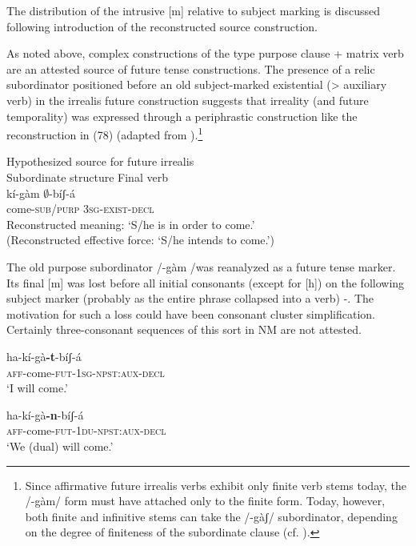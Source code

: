 \documentclass[output=paper]{langsci/langscibook}
\begin{document}
The distribution of the intrusive [m] relative to subject marking is discussed following introduction of the reconstructed source construction. 

As noted above, complex constructions of the type purpose clause + matrix verb are an attested source of future tense constructions. The presence of a relic subordinator positioned before an old subject-marked existential ({>} auxiliary verb) in the irrealis future construction suggests that irreality (and future temporality) was expressed through a periphrastic construction like the reconstruction in (78) (adapted from \citealt[11]{Ahland2014b}).\footnote{Since affirmative future irrealis verbs exhibit only finite verb stems today, the /-gàm/ form must have attached only to the finite form. Today, however, both finite and infinitive stems can take the /-gàʃ/ subordinator, depending on the degree of finiteness of the subordinate clause (cf. \citealt[629]{Ahland2012}).}

\ea\label{ex:mahland:78}
Hypothesized source for future irrealis\\
Subordinate structure   Final verb\\
\gll  kí{}-gàm        ${\emptyset}${}-bíʃ-{\downstep}á\\
  come-\textsc{sub/purp}    \textsc{3sg-exist-decl} \\
  \glt Reconstructed meaning: `S/he is in order to come.'\\
  (Reconstructed effective force: `S/he intends to come.') 
  \z
  
  The old purpose subordinator /{}-gàm /was reanalyzed as a future tense marker. Its final [m] was lost before all initial consonants (except for [h]) on the following subject marker (probably as the entire phrase collapsed into a verb) -. The motivation for such a loss could have been consonant cluster simplification. Certainly three-consonant sequences of this sort in NM are not attested. 

\ea\label{ex:mahland:79}
\gll ha-kí-gà\textbf{{}-t}{}-bíʃ-á \\
\textsc{aff}{}-come-\textsc{fut-1sg-npst:aux-decl} \\
\glt `I will come.'
\z

\ea\label{ex:mahland:80}
\gll ha-kí-gà\textbf{{}-n}{}-bíʃ-á \\
\textsc{aff}{}-come-\textsc{fut-1du-npst:aux-decl} \\
\glt `We (dual) will come.'
\z
\end{document}
